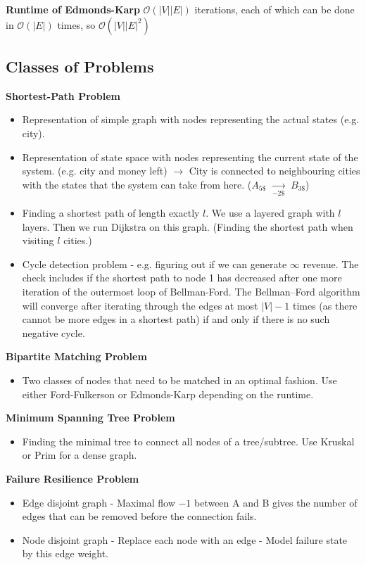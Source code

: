 \documentclass[9pt,landscape,a4paper, table]{extarticle}
\begin{document}
\begin{multicols*}{3}
\textbf{Runtime of Edmonds-Karp}
$\mathcal{O}(|V||E|)$ iterations, each of which can be done in $\mathcal{O}( |E|)$ times, so $\mathcal{O}(|V||E|^2)$

\subsection{Classes of Problems}

\textbf{Shortest-Path Problem}
\begin{itemize}
    \item Representation of simple graph with nodes representing the actual states (e.g. city).
    \item Representation of state space with nodes representing the current state of the system. (e.g. city and money left) $\rightarrow$ City is connected to neighbouring cities with the states that the system can take from here. ($A_{5\$}$ $\underset{-2\$}{\rightarrow}$ $B_{3\$}$)
    \item Finding a shortest path of length exactly $l$. We use a layered graph with $l$ layers. Then we run Dijkstra on this graph. (Finding the shortest path when visiting $l$ cities.)
    \item Cycle detection problem - e.g. figuring out if we can generate $\infty$ revenue. The check includes if the shortest path to node 1 has decreased after one more iteration of the outermost loop of Bellman-Ford. The Bellman–Ford algorithm will converge after iterating through the edges at most $| V | -1$ times (as there cannot be more edges in a shortest path) if and only if there is no such negative cycle.
\end{itemize}

\textbf{Bipartite Matching Problem}
\begin{itemize}
    \item Two classes of nodes that need to be matched in an optimal fashion. Use either Ford-Fulkerson or Edmonds-Karp depending on the runtime. 
\end{itemize}

\textbf{Minimum Spanning Tree Problem}

\begin{itemize}
    \item Finding the minimal tree to connect all nodes of a tree/subtree. Use Kruskal or Prim for a dense graph. 
\end{itemize}

\textbf{Failure Resilience Problem}

\begin{itemize}
    \item Edge disjoint graph - Maximal flow $- 1$ between A and B gives the number of edges that can be removed before the connection fails. 
    \item Node disjoint graph - Replace each node with an edge - Model failure state by this edge weight. 
\end{itemize}


\end{multicols*}
\end{document}

